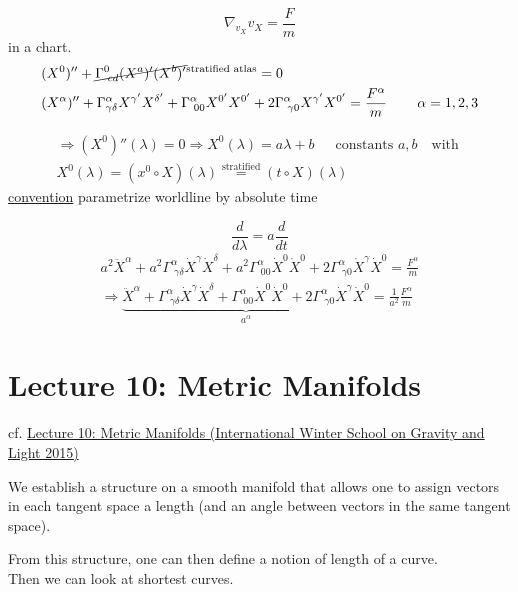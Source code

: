 \documentclass[10pt, twoside]{amsart}
\begin{document}
\begin{multicols*}{2}
\[
\nabla_{v_X} v_X = \frac{F}{m}
\]
in a chart.
\[
\begin{aligned}
& (X^0)'' + \cancel{ \Gamma^0_{ \, \, cd } (X^a)' (X^b)' }^{ \text{stratified atlas}} = 0  \\
  & (X^{\alpha})'' + \Gamma^{\alpha}_{\gamma \delta} X^{\gamma'} X^{\delta'} + \Gamma^{\alpha}_{ \, \, 00} X^{0'} X^{0'} + 2\Gamma^{\alpha}_{ \, \, \gamma 0} X^{\gamma'} X^{0'} = \frac{F^{\alpha}}{m} \quad \quad \, \alpha = 1,2,3
\end{aligned}
\]

\[
\begin{gathered}
\Longrightarrow (X^0)''(\lambda) = 0 \Longrightarrow X^0(\lambda) = a\lambda + b \quad \, \text{ constants $a,b$ } \text{ with  }  \\
X^0(\lambda) = (x^0 \circ X)(\lambda) \overset{\text{stratified}}{=} (t\circ X)(\lambda)
\end{gathered}
\]
\underline{convention} parametrize worldline by absolute time

\[
\frac{d}{d\lambda} = a \frac{d}{dt}
\]
\[
\begin{gathered}
a^2 \ddot{X}^{\alpha} + a^2 \Gamma^{\alpha}_{ \, \, \gamma \delta} \dot{X}^{\gamma} \dot{X}^{\delta} + a^2 \Gamma^{\alpha}_{ \, \, 00 } \dot{X}^0 \dot{X}^0 + 2\Gamma^{\alpha}_{ \, \,\gamma 0} \dot{X}^{\gamma} \dot{X}^{0} =  \frac{ F^{\alpha}}{ m} \\
\Longrightarrow  \underbrace{ \ddot{X}^{\alpha} +  \Gamma^{\alpha}_{ \, \, \gamma \delta} \dot{X}^{\gamma} \dot{X}^{\delta} +  \Gamma^{\alpha}_{ \, \, 00 } \dot{X}^0 \dot{X}^0 + 2\Gamma^{\alpha}_{ \, \,\gamma 0} \dot{X}^{\gamma} \dot{X}^{0} }_{a^{\alpha} } = \frac{1}{a^2} \frac{ F^{\alpha}}{ m} 
\end{gathered}
\]



\section{Lecture 10: Metric Manifolds}

cf. \href{https://youtu.be/ONCZNwKswn4}{Lecture 10: Metric Manifolds (International Winter School on Gravity and Light 2015)}

We establish a structure on a smooth manifold that allows one to assign vectors in each tangent space a length (and an angle between vectors in the same tangent space).

From this structure, one can then define a notion of length of a curve. \\
Then we can look at shortest curves.


\end{multicols*}
\end{document}
